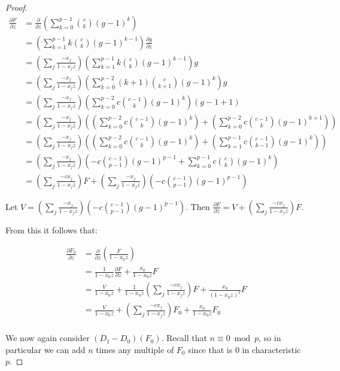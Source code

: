 \documentclass{article}
\numberwithin{equation}{section}
\begin{document}
\begin{proof}
\begin{align*}
\frac{\partial F}{\partial z}&=\frac{\partial}{\partial z}\left(\sum_{k=0}^{p-1} \binom{c}{k} (g-1)^k\right)\\
&=\left(\sum_{k=1}^{p-1}k\binom{c}{k}(g-1)^{k-1}\right)\frac{\partial g}{\partial z}\\
&=\left(\sum_j \frac{-x_j}{1-x_jz}\right)\left(\sum_{k=1}^{p-1}k\binom{c}{k}(g-1)^{k-1}\right)g\\
&=\left(\sum_j \frac{-x_j}{1-x_jz}\right)\left(\sum_{k=0}^{p-2}(k+1)\binom{c}{k+1}(g-1)^{k}\right)g\\
&=\left(\sum_j \frac{-x_j}{1-x_jz}\right)\left(\sum_{k=0}^{p-2}c\binom{c-1}{k}(g-1)^{k}\right)(g-1+1)\\
&=\left(\sum_j \frac{-x_j}{1-x_jz}\right)\left(\left(\sum_{k=0}^{p-2}c\binom{c-1}{k}(g-1)^{k}\right)+\left(\sum_{k=0}^{p-2}c\binom{c-1}{k}(g-1)^{k+1}\right)\right)\\
&=\left(\sum_j \frac{-x_j}{1-x_jz}\right)\left(\left(\sum_{k=0}^{p-2}c\binom{c-1}{k}(g-1)^{k}\right)+\left(\sum_{k=1}^{p-1}c\binom{c-1}{k-1}(g-1)^{k}\right)\right)\\
&=\left(\sum_j \frac{-x_j}{1-x_jz}\right)\left(-c\binom{c-1}{p-1}(g-1)^{p-1}+\sum_{k=0}^{p-1}c\binom{c}{k}(g-1)^{k}\right)\\
&=\left(\sum_j \frac{-cx_j}{1-x_jz}\right)F+\left(\sum_j \frac{-x_j}{1-x_jz}\right)\left(-c\binom{c-1}{p-1}(g-1)^{p-1}\right)
\end{align*}

Let $V=\left(\sum_j \frac{-x_j}{1-x_jz}\right)\left(-c\binom{c-1}{p-1}(g-1)^{p-1}\right)$. Then $\frac{\partial F}{\partial z}=V+\left(\sum_j \frac{-cx_j}{1-x_jz}\right)F$.

From this it follows that:

\begin{align*}
\frac{\partial F_0}{\partial z} &= \frac{\partial}{\partial z}\left(\frac{F}{1-x_0z}\right)\\
&=\frac{1}{1-x_0z} \frac{\partial F}{\partial z}+\frac{x_0}{1-x_0z} F\\
&=\frac{V}{1-x_0z}+\frac{1}{1-x_0z}\left(\sum_j \frac{-cx_j}{1-x_jz}\right)F+\frac{x_0}{(1-x_0z)^2} F\\
&=\frac{V}{1-x_0z}+\left(\sum_j \frac{-cx_j}{1-x_jz}\right)F_0+\frac{x_0}{1-x_0z} F_0\\
\end{align*}

We now again consider $(D_1-D_0)(F_0)$. Recall that $n \equiv 0 \bmod p$, so in particular we can add $n$ times any multiple of $F_0$ since that is $0$ in characteristic $p$. 


\end{proof}
\end{document}
